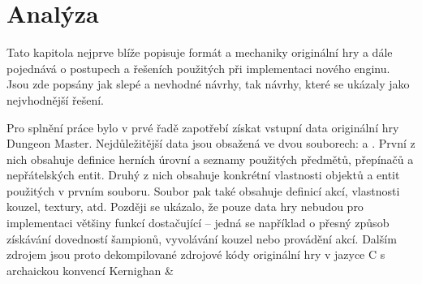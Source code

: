 \chapter{Analýza}

Tato kapitola nejprve blíže popisuje formát a mechaniky originální hry a dále pojednává o postupech a řešeních použitých 
při implementaci nového enginu. Jsou zde popsány jak slepé a nevhodné návrhy, tak návrhy, které se ukázaly 
jako nejvhodnější řešení.

Pro splnění práce bylo v prvé řadě zapotřebí získat vstupní data originální hry Dungeon Master. Nejdůležitější data 
jsou obsažená ve dvou souborech:  a . První z nich obsahuje definice herních úrovní a seznamy 
použitých předmětů, přepínačů a nepřátelských entit. Druhý z nich obsahuje konkrétní vlastnosti objektů a entit použitých v prvním souboru. 
Soubor  pak také obsahuje definicí akcí, vlastnosti kouzel, textury, atd. Později se ukázalo, že pouze data hry nebudou
pro implementaci většiny funkcí dostačující -- jedná se například o přesný způsob získávání dovedností šampionů, 
vyvolávání kouzel nebo provádění akcí. Dalším zdrojem jsou proto dekompilované zdrojové kódy \cite{DMDecompilation} originální hry v jazyce C s archaickou konvencí Kernighan \&
